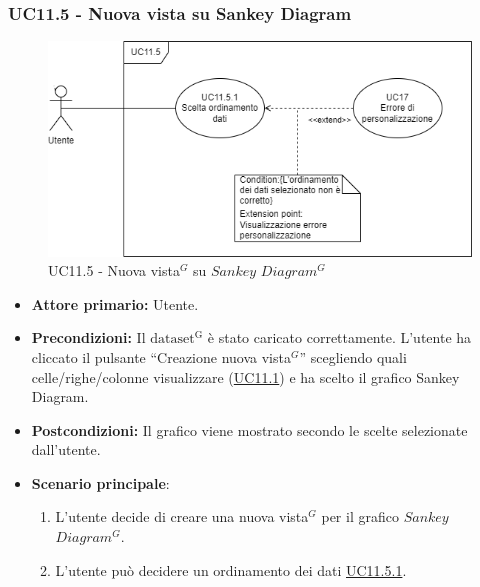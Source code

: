
\subsubsection{UC11.5 - Nuova vista su Sankey Diagram}
\label{sec:UC11.5}
\begin{figure}[h!]
	\centering
	\includegraphics[scale=0.60]{../../assets/creazionevista_sankey.png}
	\caption{UC11.5 - Nuova vista$^{G}$ su $Sankey$ $Diagram^{G}$}
\end{figure}
\begin{itemize}
    \item \textbf{Attore primario:} Utente.
    \item \textbf{Precondizioni:} Il ${\mathrm{dataset^{G}}}$ è stato caricato correttamente. L'utente ha cliccato il pulsante ``Creazione nuova vista$^{G}$'' scegliendo quali celle/righe/colonne visualizzare (\hyperref[sec:UC11.1]{UC11.1}) e ha scelto il grafico Sankey Diagram.
    \item \textbf{Postcondizioni:} Il grafico viene mostrato secondo le scelte selezionate dall'utente.
    \item \textbf{Scenario principale}:
    \begin{enumerate}
		\item L'utente decide di creare una nuova vista$^{G}$ per il grafico $Sankey$ $Diagram^{G}$.
		\item L'utente può decidere un ordinamento dei dati \hyperref[sec:UC11.5.1]{UC11.5.1}.
	\end{enumerate}
\end{itemize}

